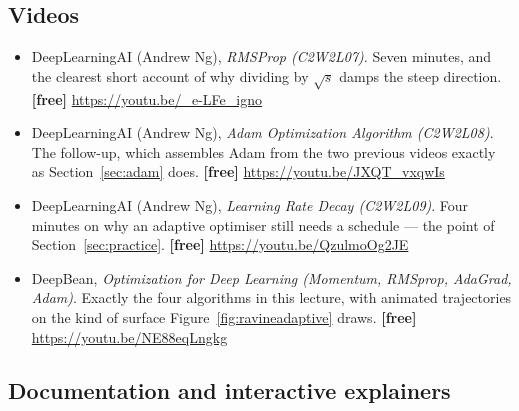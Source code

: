 \documentclass[11pt]{article}
\begin{document}
\subsection*{Videos}

\begin{itemize}[leftmargin=*]
  \item DeepLearningAI (Andrew Ng), \emph{RMSProp (C2W2L07)}. Seven minutes,
    and the clearest short account of why dividing by $\sqrt{s}$ damps the
    steep direction. \textbf{[free]} \url{https://youtu.be/_e-LFe_igno}
  \item DeepLearningAI (Andrew Ng), \emph{Adam Optimization Algorithm
    (C2W2L08)}. The follow-up, which assembles Adam from the two previous
    videos exactly as Section~\ref{sec:adam} does. \textbf{[free]}
    \url{https://youtu.be/JXQT_vxqwIs}
  \item DeepLearningAI (Andrew Ng), \emph{Learning Rate Decay (C2W2L09)}. Four
    minutes on why an adaptive optimiser still needs a schedule --- the point
    of Section~\ref{sec:practice}. \textbf{[free]}
    \url{https://youtu.be/QzulmoOg2JE}
  \item DeepBean, \emph{Optimization for Deep Learning (Momentum, RMSprop,
    AdaGrad, Adam)}. Exactly the four algorithms in this lecture, with animated
    trajectories on the kind of surface Figure~\ref{fig:ravineadaptive} draws.
    \textbf{[free]} \url{https://youtu.be/NE88eqLngkg}
\end{itemize}

\subsection*{Documentation and interactive explainers}
\end{document}

